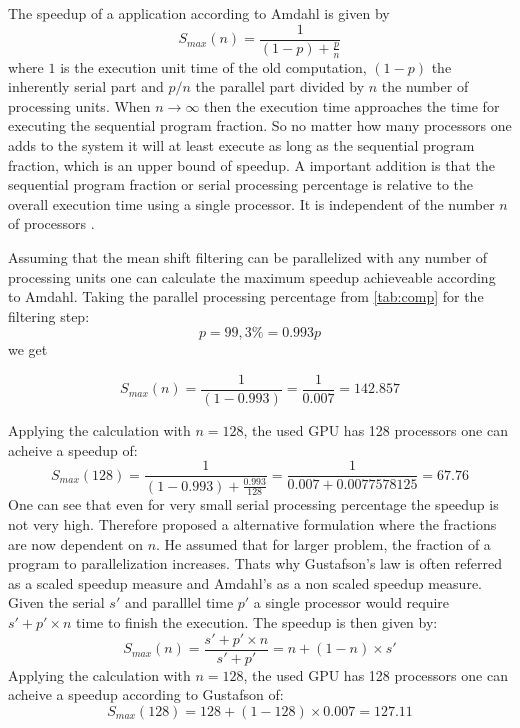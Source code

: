 The speedup of a application according to Amdahl is given by
\begin{equation}\label{eq:amdahl}
  S_{max}(n) = \frac{1}{(1-p) + \frac{p}{n}}
\end{equation} 
where $1$ is the execution unit time of the old computation, $(1-p)$
the inherently serial part and $p/n$ the parallel part divided by $n$
the number of processing units. When $n \rightarrow \infty$ then the
execution time approaches the time for executing the sequential
program fraction. So no matter how many processors one adds to the
system it will at least execute as long as the sequential program
fraction, which is an upper bound of speedup. A important addition is
that the sequential program fraction or serial processing percentage
is relative to the overall execution time using a single processor. It
is independent of the number $n$ of processors
\citeauthor{citeulike:3838998} \citep{citeulike:3838998}.

Assuming that the mean shift filtering can be parallelized with any number of
processing units one can calculate the maximum speedup achieveable according to
Amdahl. Taking the parallel processing percentage from \autoref{tab:comp} for
the filtering step:
\begin{equation*}\label{eq:parallel}
  p = 99,3\% = 0.993 
  p\end{equation*}
we get

\begin{equation*}\label{eq:am0}
  S_{max}(n) = \frac{1}{(1-0.993)} = \frac{1}{0.007} = 142.857	
\end{equation*}

Applying the calculation with $n = 128$, the used \gls{GPU} has 128
processors one can acheive a speedup of:
\begin{equation*}\label{eq:g92sp}
  S_{max}(128) = \frac{1}{(1-0.993) + \frac{0.993}{128}} = \frac{1}{0.007 + 0.0077578125} = 67.76
\end{equation*}
One can see that even for very small serial processing percentage the speedup is
not very high. Therefore \citeauthor{citeulike:3732921} proposed a alternative
formulation where the fractions are now dependent on $n$. He assumed that for
larger problem, the fraction of a program to parallelization increases. Thats
why Gustafson's law is often referred as a scaled speedup measure and Amdahl's
as a non scaled speedup measure. Given the serial $s'$ and paralllel time $p'$ a
single processor would require $s' + p' \times n$ time to finish the execution.
The speedup is then given by:
\begin{equation}\label{eq:gus}
  S_{max}(n) = \frac{s' + p' \times n}{s' + p'} = n + ( 1 - n ) \times s'
\end{equation}
Applying the calculation with $n = 128$, the used \gls{GPU} has 128 processors
one can acheive a speedup according to Gustafson of:
\begin{equation*}\label{eq:g92sp}
  S_{max}(128) = 128 + (1 - 128) \times 0.007 = 127.11
\end{equation*}

